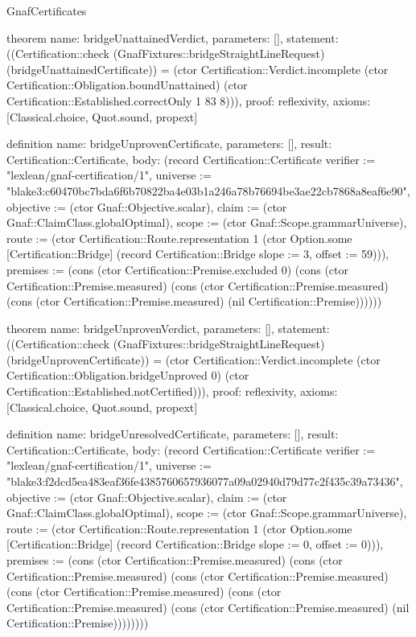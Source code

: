 \begin{lexlean}{GnafCertificates}
\begin{semanticmodule}
theorem{
  name: bridgeUnattainedVerdict,
  parameters: [],
  statement: ((Certification::check (GnafFixtures::bridgeStraightLineRequest) (bridgeUnattainedCertificate)) = (ctor Certification::Verdict.incomplete (ctor Certification::Obligation.boundUnattained) (ctor Certification::Established.correctOnly 1 83 8))),
  proof: reflexivity{},
  axioms: [Classical.choice, Quot.sound, propext]
}

definition{
  name: bridgeUnprovenCertificate,
  parameters: [],
  result: Certification::Certificate,
  body: (record Certification::Certificate {verifier := "lexlean/gnaf-certification/1", universe := "blake3:c60470bc7bda6f6b70822ba4e03b1a246a78b76694be3ae22cb7868a8eaf6e90", objective := (ctor Gnaf::Objective.scalar), claim := (ctor Gnaf::ClaimClass.globalOptimal), scope := (ctor Gnaf::Scope.grammarUniverse), route := (ctor Certification::Route.representation 1 (ctor Option.some [Certification::Bridge] (record Certification::Bridge {slope := 3, offset := 59}))), premises := (cons (ctor Certification::Premise.excluded 0) (cons (ctor Certification::Premise.measured) (cons (ctor Certification::Premise.measured) (cons (ctor Certification::Premise.measured) (nil Certification::Premise)))))})
}

theorem{
  name: bridgeUnprovenVerdict,
  parameters: [],
  statement: ((Certification::check (GnafFixtures::bridgeStraightLineRequest) (bridgeUnprovenCertificate)) = (ctor Certification::Verdict.incomplete (ctor Certification::Obligation.bridgeUnproved 0) (ctor Certification::Established.notCertified))),
  proof: reflexivity{},
  axioms: [Classical.choice, Quot.sound, propext]
}

definition{
  name: bridgeUnresolvedCertificate,
  parameters: [],
  result: Certification::Certificate,
  body: (record Certification::Certificate {verifier := "lexlean/gnaf-certification/1", universe := "blake3:f2dcd5ea483eaf36fe4385760657936077a09a02940d79d77c2f435c39a73436", objective := (ctor Gnaf::Objective.scalar), claim := (ctor Gnaf::ClaimClass.globalOptimal), scope := (ctor Gnaf::Scope.grammarUniverse), route := (ctor Certification::Route.representation 1 (ctor Option.some [Certification::Bridge] (record Certification::Bridge {slope := 0, offset := 0}))), premises := (cons (ctor Certification::Premise.measured) (cons (ctor Certification::Premise.measured) (cons (ctor Certification::Premise.measured) (cons (ctor Certification::Premise.measured) (cons (ctor Certification::Premise.measured) (cons (ctor Certification::Premise.measured) (nil Certification::Premise)))))))})
}


\end{semanticmodule}
\end{lexlean}
